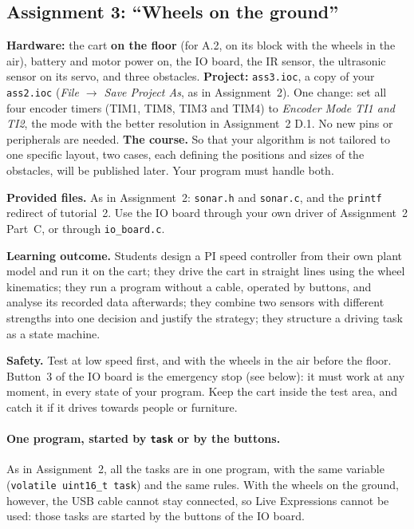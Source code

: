 \documentclass[11pt,a4paper]{article}
\begin{document}
\subsection{Assignment 3: ``Wheels on the ground''}

\textbf{Hardware:} the cart \textbf{on the floor} (for A.2, on its block with the wheels in the air), battery and motor
power on, the IO board, the IR sensor, the ultrasonic sensor on its servo, and three obstacles.\quad
\textbf{Project:} \texttt{ass3.ioc}, a copy of your \texttt{ass2.ioc} (\emph{File $\to$ Save Project As}, as in
Assignment~2). One change: set all four encoder timers (TIM1, TIM8, TIM3 and TIM4) to \emph{Encoder Mode TI1 and TI2},
the mode with the better resolution in Assignment~2 D.1. No new pins or peripherals are needed.
\textbf{The course.} So that your algorithm is not tailored to one specific layout, two cases, each defining the
positions and sizes of the obstacles, will be published later. Your program must handle both.

\medskip\noindent
\textbf{Provided files.} As in Assignment~2: \texttt{sonar.h} and \texttt{sonar.c}, and the \texttt{printf} redirect of
tutorial~2. Use the IO board through your own driver of Assignment~2 Part~C, or through \texttt{io\_board.c}.

\medskip\noindent
\textbf{Learning outcome.} Students design a PI speed controller from their own plant model and run it on the cart;
they drive the cart in straight lines using the wheel kinematics; they run a program without a cable, operated by
buttons, and analyse its recorded data afterwards; they combine two sensors with different strengths into one decision
and justify the strategy; they structure a driving task as a state machine.

\medskip\noindent
\textbf{Safety.} Test at low speed first, and with the wheels in the air before the floor. Button~3 of the IO board is
the emergency stop (see below): it must work at any moment, in every state of your program. Keep the cart inside the
test area, and catch it if it drives towards people or furniture.

\paragraph{One program, started by \texttt{task} or by the buttons.}
As in Assignment~2, all the tasks are in one program, with the same variable (\texttt{volatile uint16\_t task}) and the
same rules. With the wheels on the ground, however, the USB cable cannot stay connected, so Live Expressions cannot be
used: those tasks are started by the buttons of the IO board.
\end{document}

